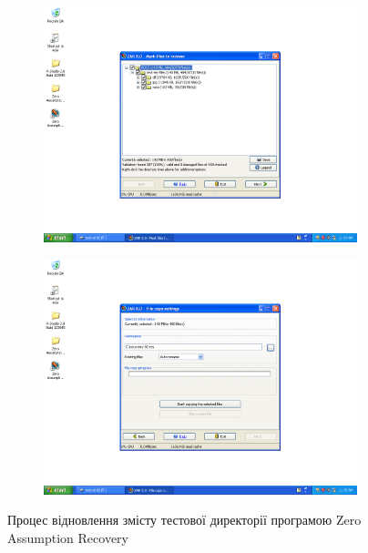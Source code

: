 \documentclass[
	a4paper,
	oneside,
	DIV = 12,
	fontsize = 13pt,
	headings = normal,
]{scrartcl}
\begin{document}
\begin{figure}[!htbp]
\begin{subfigure}{0.5\columnwidth}
				\caption{}
				\label{subfig:04-02-zar}
			\end{subfigure}
			\begin{subfigure}{0.5\columnwidth}
				\centering
				\includegraphics[height = 9\baselineskip]{./assets/y03s01-pcdiag-lab-03-p13.png}
				\caption{}
				\label{subfig:04-03-zar}
			\end{subfigure}%
			\begin{subfigure}{0.5\columnwidth}
				\centering
				\includegraphics[height = 9\baselineskip]{./assets/y03s01-pcdiag-lab-03-p14.png}
				\caption{}
				\label{subfig:04-04-zar}
			\end{subfigure}
			\caption{Процес відновлення змісту тестової директорії програмою \textenglish{Zero Assumption Recovery}}
			\label{fig:04-zar-recovery}
		\end{figure}
\end{document}
